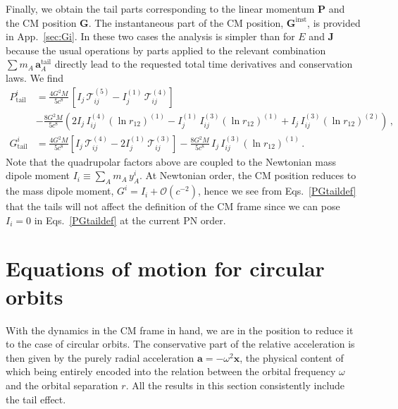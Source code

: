 \documentclass[prd,preprint,superscriptaddress,tightenlines,nofootinbib,
  eqsecnum,showpacs]{revtex4}
\begin{document}
Finally, we obtain the tail parts corresponding to the linear momentum $\bm{P}$
and the CM position $\bm{G}$. The instantaneous part of the CM position,
$\bm{G}^\text{inst}$, is provided in App.~\ref{sec:Gi}. In these two cases the
analysis is simpler than for $E$ and $\bm{J}$ because the usual operations by
parts applied to the relevant combination $\sum m_A\, \bm{a}_A^\text{tail}$
directly lead to the requested total time derivatives and conservation laws. We
find
%
\begin{subequations}\label{PGtaildef}
\begin{align}
P^i_\text{tail} &= \frac{4G^2M}{5c^8}\,\left[
    I_{j}\,\mathcal{T}_{ij}^{(5)} -
    I_{j}^{(1)}\,\mathcal{T}_{ij}^{(4)}\right]\nonumber\\& -
  \frac{8G^2M}{5c^8}\left( 2I_{j}\,I_{ij}^{(4)} (\ln r_{12})^{(1)} -
  I_{j}^{(1)}\,I_{ij}^{(3)} (\ln r_{12})^{(1)} + I_{j}\,I_{ij}^{(3)}
  (\ln r_{12})^{(2)} \right)\,,\\
G^i_\text{tail} &=
  \frac{4G^2M}{5c^8}\!\left[ I_{j}\,\mathcal{T}_{ij}^{(4)} - 2
    I_{j}^{(1)}\,\mathcal{T}_{ij}^{(3)}\right] -
  \frac{8G^2M}{5c^8}\,I_{j}\,I_{ij}^{(3)} (\ln
  r_{12})^{(1)}\,.
\end{align}
\end{subequations}
%
Note that the quadrupolar factors above are coupled to the Newtonian mass
dipole moment $I_i\equiv\sum_A m_A\,y_A^i$. At Newtonian order, the CM position reduces to the mass dipole moment,
$G^i=I_i + \mathcal{O}(c^{-2})$, hence we see from Eqs.~\eqref{PGtaildef} that
the tails will not affect the definition of the CM frame since we can pose
$I_i = 0$ in Eqs.~\eqref{PGtaildef} at the current PN order.


\section{Equations of motion for circular orbits} 
\label{sec:EOMcirc} 

With the dynamics in the CM frame in hand, we are in the position to reduce
it to the case of circular orbits. The conservative part of the relative
acceleration is then given by the purely radial acceleration
$\bm{a} = -\omega^2 \bm{x}$, the physical content of which being entirely encoded into the relation between the orbital frequency $\omega$ and the
orbital separation $r$. All the results in this section consistently include the tail effect.
\end{document}
